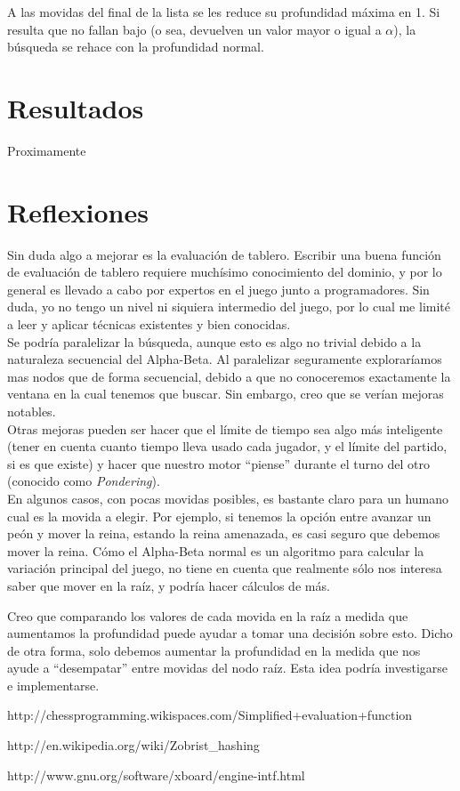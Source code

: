 \documentclass{article}
\begin{document}
A las movidas del final de la lista se les reduce su profundidad máxima
en 1. Si resulta que no fallan bajo (o sea, devuelven un valor mayor o
igual a $\alpha$), la búsqueda se rehace con la profundidad normal.

\section{Resultados}
Proximamente

\section{Reflexiones}
Sin duda algo a mejorar es la evaluación de tablero. Escribir una buena
función de evaluación de tablero requiere muchísimo conocimiento
del dominio, y por lo general es llevado a cabo por expertos en el
juego junto a programadores. Sin duda, yo no tengo un nivel ni siquiera
intermedio del juego, por lo cual me limité a leer y aplicar técnicas
existentes y bien conocidas.
\\

Se podría paralelizar la búsqueda, aunque esto es algo no trivial
debido a la naturaleza secuencial del Alpha-Beta. Al paralelizar
seguramente exploraríamos mas nodos que de forma secuencial, debido a
que no conoceremos exactamente la ventana en la cual tenemos que buscar.
Sin embargo, creo que se verían mejoras notables.
\\

Otras mejoras pueden ser hacer que el límite de tiempo sea algo más
inteligente (tener en cuenta cuanto tiempo lleva usado cada jugador,
y el límite del partido, si es que existe) y hacer que nuestro motor
``piense'' durante el turno del otro (conocido como \emph{Pondering}).
\\

En algunos casos, con pocas movidas posibles, es bastante claro para un
humano cual es la movida a elegir. Por ejemplo, si tenemos la opción
entre avanzar un peón y mover la reina, estando la reina amenazada, es
casi seguro que debemos mover la reina. Cómo el Alpha-Beta normal es un
algoritmo para calcular la variación principal del juego, no tiene en
cuenta que realmente sólo nos interesa saber que mover en la raíz, y
podría hacer cálculos de más.

Creo que comparando los valores de cada movida en la raíz a medida que
aumentamos la profundidad puede ayudar a tomar una decisión sobre esto.
Dicho de otra forma, solo debemos aumentar la profundidad en la medida
que nos ayude a ``desempatar'' entre movidas del nodo raíz. Esta idea
podría investigarse e implementarse.

\begin{thebibliography}{9}

  http://chessprogramming.wikispaces.com/Simplified+evaluation+function

  http://en.wikipedia.org/wiki/Zobrist\_hashing

  http://www.gnu.org/software/xboard/engine-intf.html

\end{thebibliography}
\end{document}
